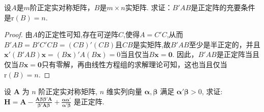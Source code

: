 \documentclass[../../main.tex]{subfiles}%
\begin{document}
\begin{proposition}\label{proposition:第8章解答题6}
设\(A\)是\(m\)阶正定实对称矩阵，\(B\)是\(m\times n\)实矩阵. 求证：\(B'AB\)是正定阵的充要条件是\(\mathrm{r}(B)=n\).
\end{proposition}
\begin{proof}
由\(A\)的正定性可知,存在可逆阵$C$,使得$A=C'C$,从而\(B'AB=B'C'CB=(CB)'(CB)\)且$CB$是实矩阵,故$B'AB$至少是半正定的，并且\(\boldsymbol{x}'(B'AB)\boldsymbol{x}=(B\boldsymbol{x})'A(B\boldsymbol{x}) = 0\)当且仅当\(B\boldsymbol{x}=\boldsymbol{0}\). 因此，\(B'AB\)是正定阵当且仅当\(B\boldsymbol{x}=\boldsymbol{0}\)只有零解，再由线性方程组的求解理论可知，这也当且仅当\(\mathrm{r}(B)=n\). 
\end{proof}

\begin{proposition}\label{proposition:A正定则H正定}
设 \(\boldsymbol{A}\) 为 \(n\) 阶正定实对称矩阵, \(n\) 维实列向量 \(\boldsymbol{\alpha},\boldsymbol{\beta}\) 满足 \(\boldsymbol{\alpha}'\boldsymbol{\beta}>0\), 求证: \(\boldsymbol{H}=\boldsymbol{A}-\frac{\boldsymbol{A}\boldsymbol{\beta}\boldsymbol{\beta}'\boldsymbol{A}}{\boldsymbol{\beta}'\boldsymbol{A}\boldsymbol{\beta}}+\frac{\boldsymbol{\alpha}\boldsymbol{\alpha}'}{\boldsymbol{\alpha}'\boldsymbol{\beta}}\) 是正定阵.
\end{proposition}
\end{document}
